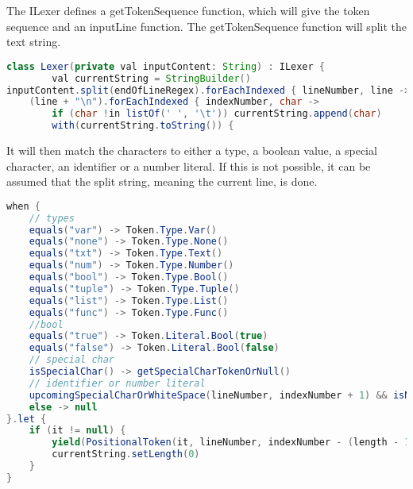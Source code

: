The ILexer defines a getTokenSequence function, which will give the token sequence and an inputLine function.
The getTokenSequence function will split the text string.
\begin{lstlisting}[language=java,label=lis:LexerStringSplit,caption=The string is being split and new lines are added to the string .,firstnumber=8]
class Lexer(private val inputContent: String) : ILexer { 
        val currentString = StringBuilder()
inputContent.split(endOfLineRegex).forEachIndexed { lineNumber, line ->
	(line + "\n").forEachIndexed { indexNumber, char ->
		if (char !in listOf(' ', '\t')) currentString.append(char)
		with(currentString.toString()) {
\end{lstlisting}		
It will then match the characters to either a type, a boolean value, a special character, an identifier or a number literal.
If this is not possible, it can be assumed that the split string, meaning the current line, is done.
\begin{lstlisting}[language=java,label=lis:LexerStringMatcher,caption=The split string is being matched to a token,firstnumber=19]
when {
	// types
	equals("var") -> Token.Type.Var()
	equals("none") -> Token.Type.None()
	equals("txt") -> Token.Type.Text()
	equals("num") -> Token.Type.Number()
	equals("bool") -> Token.Type.Bool()
	equals("tuple") -> Token.Type.Tuple()
	equals("list") -> Token.Type.List()
	equals("func") -> Token.Type.Func()
	//bool
	equals("true") -> Token.Literal.Bool(true)
	equals("false") -> Token.Literal.Bool(false)
	// special char
	isSpecialChar() -> getSpecialCharTokenOrNull()
	// identifier or number literal
	upcomingSpecialCharOrWhiteSpace(lineNumber, indexNumber + 1) && isNotEmpty() -> getLiteralOrIdentifier()
	else -> null
}.let {
	if (it != null) {
		yield(PositionalToken(it, lineNumber, indexNumber - (length - 1)))
		currentString.setLength(0)
	}
}
\end{lstlisting}